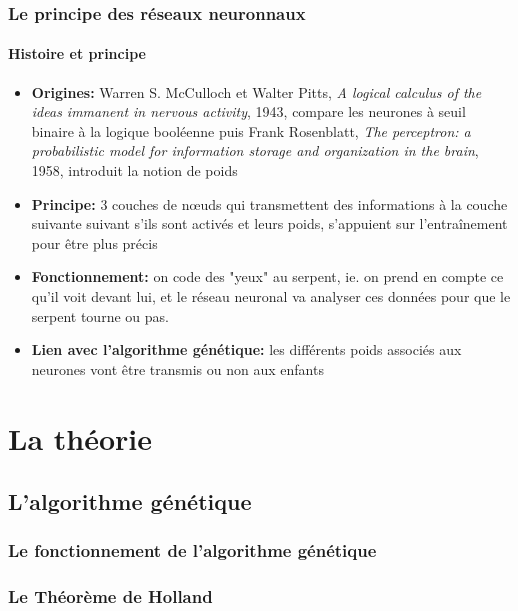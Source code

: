 \documentclass[10pt]{beamer}
\begin{document}
\begin{frame}

  \frametitle{Le principe des réseaux neuronnaux}
  \framesubtitle{Histoire et principe}

  \begin{itemize}

    \item \textbf{Origines:} Warren S. McCulloch et Walter Pitts, \textit{A logical calculus of the ideas immanent in nervous activity}, 1943, compare les neurones à seuil binaire à la logique booléenne puis Frank Rosenblatt, \textit{The perceptron: a probabilistic model for information storage and organization in the brain}, 1958, introduit la notion de poids

    \item \textbf{Principe:} 3 couches de n\oe uds qui transmettent des informations à la couche suivante suivant s'ils sont activés et leurs poids, s'appuient sur l'entraînement pour être plus précis

    \item \textbf{Fonctionnement:} on code des "yeux" au serpent, ie. on prend en compte ce qu'il voit devant lui, et le réseau neuronal va analyser ces données pour que le serpent tourne ou pas.

    \item \textbf{Lien avec l'algorithme génétique:} les différents poids associés aux neurones vont être transmis ou non aux enfants

  \end{itemize}

  \end{frame}

  \section{La théorie}


  \subsection{L'algorithme génétique}

  \begin{frame}
    \frametitle{Le fonctionnement de l'algorithme génétique}
  \end{frame}

  \begin{frame}
    \frametitle{Le Théorème de Holland}
  \end{frame}
\end{document}
